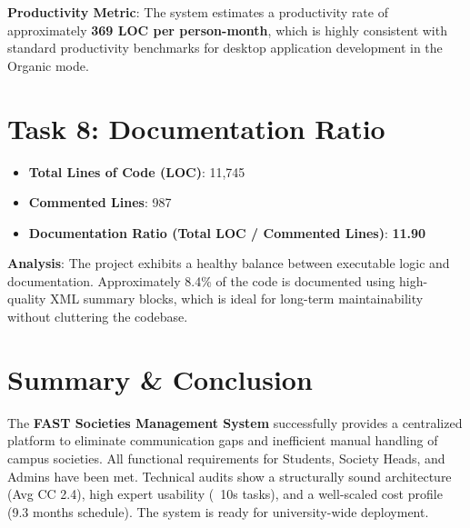 \documentclass[12pt,a4paper]{article}
\begin{document}
\textbf{Productivity Metric}: The system estimates a productivity rate of approximately \textbf{369 LOC per person-month}, which is highly consistent with standard productivity benchmarks for desktop application development in the Organic mode.

\section{Task 8: Documentation Ratio}
\begin{itemize}
    \item \textbf{Total Lines of Code (LOC)}: 11,745
    \item \textbf{Commented Lines}: 987
    \item \textbf{Documentation Ratio (Total LOC / Commented Lines)}: \textbf{11.90}
\end{itemize}
\textbf{Analysis}: The project exhibits a healthy balance between executable logic and documentation. Approximately 8.4\% of the code is documented using high-quality XML summary blocks, which is ideal for long-term maintainability without cluttering the codebase.

\section{Summary \& Conclusion}
The \textbf{FAST Societies Management System} successfully provides a centralized platform to eliminate communication gaps and inefficient manual handling of campus societies. All functional requirements for Students, Society Heads, and Admins have been met. Technical audits show a structurally sound architecture (Avg CC 2.4), high expert usability (~10s tasks), and a well-scaled cost profile (9.3 months schedule). The system is ready for university-wide deployment.
\end{document}
